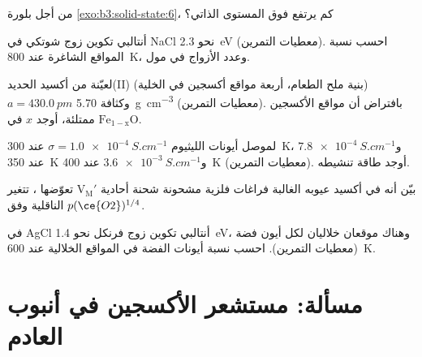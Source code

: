 \begin{exercise}[$\star\star$]\label{exo:b3:solid-state:7}
من أجل بلورة \cref{exo:b3:solid-state:6}، كم يرتفع  فوق المستوى
الذاتي؟
\end{exercise}

\begin{exercise}[$\star\star$]\label{exo:b3:solid-state:8}
أنتالبي تكوين زوج شوتكي في NaCl نحو \qty{2.3}{eV} (معطيات
التمرين). احسب نسبة المواقع الشاغرة عند \qty{800}{K}، وعدد
الأزواج في مول.
\end{exercise}

\begin{exercise}[$\star\star$]\label{exo:b3:solid-state:9}
لعيّنة من أكسيد الحديد(II) (بنية ملح الطعام، أربعة مواقع أكسجين في الخلية)
$a = \qty{430.0}{pm}$ وكثافة \qty{5.70}{g.cm^{-3}} (معطيات التمرين). بافتراض
أن مواقع الأكسجين ممتلئة، أوجد $x$ في $\mathrm{Fe_{1-x}O}$.
\end{exercise}

\begin{exercise}[$\star\star\star$]\label{exo:b3:solid-state:10}
لموصل أيونات الليثيوم $\sigma = \qty{1.0e-4}{S.cm^{-1}}$ عند \qty{300}{K}، و$\qty{7.8e-4}{S.cm^{-1}}$ عند \qty{350}{K} 
و$\qty{3.6e-3}{S.cm^{-1}}$ عند \qty{400}{K} (معطيات التمرين). أوجد طاقة تنشيطه.
\end{exercise}

\begin{exercise}[$\star\star\star$]\label{exo:b3:solid-state:11}
بيّن أنه في أكسيد عيوبه الغالبة فراغات فلزية مشحونة شحنة أحادية
$\mathrm{V_M'}$ تعوّضها ، تتغير الناقلية وفق $p(\ce{O2})^{1/4}$.
\end{exercise}

\begin{exercise}[$\star\star\star$]\label{exo:b3:solid-state:12}
في AgCl أنتالبي تكوين زوج فرنكل نحو \qty{1.4}{eV}، وهناك
موقعان خلاليان لكل أيون فضة (معطيات التمرين). احسب نسبة
أيونات الفضة في المواقع الخلالية عند \qty{600}{K}.
\end{exercise}

\section{مسألة: مستشعر الأكسجين في أنبوب العادم}


